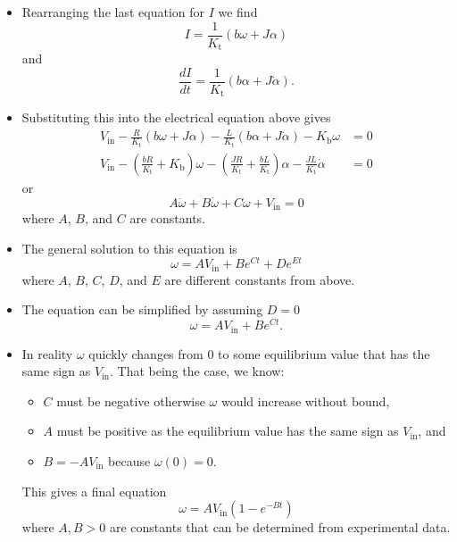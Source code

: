 \documentclass{article}
\begin{document}
\begin{itemize}
  \item Rearranging the last equation for $I$ we find \[I = \frac{1}{K_\text{t}} (b \omega + J \alpha)\] and \[\frac{d I}{d t} = \frac{1}{K_\text{t}} (b \alpha + J \dot{\alpha}).\]

  \item Substituting this into the electrical equation above gives \begin{align*}
          V_\text{in} - \frac{R}{K_\text{t}} (b \omega + J \alpha) - \frac{L}{K_\text{t}} (b \alpha + J \dot{\alpha}) - K_\text{b} \omega                                                       & = 0 \\
          V_\text{in} - \left( \frac{b R}{K_\text{t}} + K_\text{b} \right) \omega - \left( \frac{J R}{K_\text{t}} + \frac{b L}{K_\text{t}} \right) \alpha - \frac{J L}{K_\text{t}} \dot{\alpha} & = 0
        \end{align*} or \[A \ddot{\omega} + B \dot{\omega} + C \omega + V_\text{in} = 0\] where $A$, $B$, and $C$ are constants.

  \item The general solution to this equation is \[\omega = A V_\text{in} + B e^{C t} + D e^{E t}\] where $A$, $B$, $C$, $D$, and $E$ are different constants from above.

  \item The equation can be simplified by assuming $D = 0$ \[\omega = A V_\text{in} + B e^{C t}.\]

  \item In reality $\omega$ quickly changes from $0$ to some equilibrium value that has the same sign as $V_\text{in}$. That being the case, we know:

        \begin{itemize}
          \item $C$ must be negative otherwise $\omega$ would increase without bound,

          \item $A$ must be positive as the equilibrium value has the same sign as $V_\text{in}$, and

          \item $B = -A V_\text{in}$ because $\omega(0) = 0$.
        \end{itemize}

        This gives a final equation \[\omega = A V_\text{in} (1 - e^{-B t})\] where $A, B > 0$ are constants that can be determined from experimental data.


\end{itemize}
\end{document}
